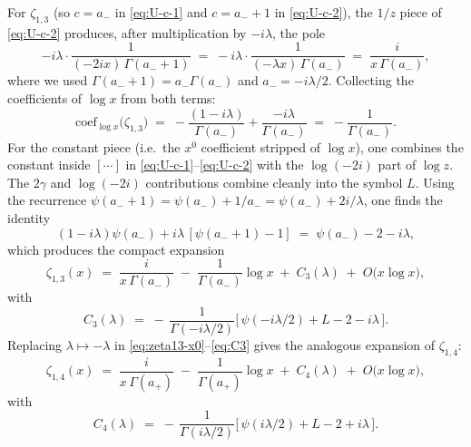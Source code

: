 \documentclass[
 aip,
 jmp,
 amsmath,amssymb,
 reprint,
 nofootinbib,
]{revtex4-2}
\begin{document}
For $\zeta_{1,3}$ (so $c=a_-$ in \eqref{eq:U-c-1} and $c=a_-+1$ in \eqref{eq:U-c-2}), the $1/z$ piece of \eqref{eq:U-c-2} produces, after multiplication by $-i\lambda$, the pole
\begin{equation}
    -i\lambda\cdot\frac{1}{(-2ix)\,\Gamma(a_- + 1)} \;=\; -i\lambda\cdot\frac{1}{(-\lambda x)\,\Gamma(a_-)} \;=\; \frac{i}{x\,\Gamma(a_-)},
\end{equation}
where we used $\Gamma(a_- + 1)=a_-\Gamma(a_-)$ and $a_-=-i\lambda/2$. Collecting the coefficients of $\log x$ from both terms:
\begin{equation}
    \text{coef}_{\log x}\big(\zeta_{1,3}\big) \;=\; -\frac{(1-i\lambda)}{\Gamma(a_-)} + \frac{-i\lambda}{\Gamma(a_-)} \;=\; -\frac{1}{\Gamma(a_-)}.
\end{equation}
For the constant piece (i.e.\ the $x^{0}$ coefficient stripped of $\log x$), one combines the constant inside $[\cdots]$ in \eqref{eq:U-c-1}--\eqref{eq:U-c-2} with the $\log(-2i)$ part of $\log z$. The $2\gamma$ and $\log(-2i)$ contributions combine cleanly into the symbol $L$. Using the recurrence $\psi(a_-+1)=\psi(a_-)+1/a_- = \psi(a_-) + 2i/\lambda$, one finds the identity
\begin{equation}
    (1-i\lambda)\psi(a_-) + i\lambda\,[\psi(a_-+1) - 1] \;=\; \psi(a_-) - 2 - i\lambda,
\end{equation}
which produces the compact expansion
\begin{equation}\label{eq:zeta13-x0}
    \zeta_{1,3}(x) \;=\; \frac{i}{x\,\Gamma(a_-)} \;-\; \frac{1}{\Gamma(a_-)}\log x \;+\; C_{3}(\lambda) \;+\; O\!\big(x\log x\big),
\end{equation}
with
\begin{equation}\label{eq:C3}
    \boxed{\;C_{3}(\lambda) \;=\; -\,\frac{1}{\Gamma(-i\lambda/2)}\Big[\,\psi(-i\lambda/2) + L - 2 - i\lambda\,\Big].\;}
\end{equation}
Replacing $\lambda\mapsto-\lambda$ in \eqref{eq:zeta13-x0}--\eqref{eq:C3} gives the analogous expansion of $\zeta_{1,4}$:
\begin{equation}\label{eq:zeta14-x0}
    \zeta_{1,4}(x) \;=\; \frac{i}{x\,\Gamma(a_+)} \;-\; \frac{1}{\Gamma(a_+)}\log x \;+\; C_{4}(\lambda) \;+\; O\!\big(x\log x\big),
\end{equation}
with
\begin{equation}\label{eq:C4}
    C_{4}(\lambda) \;=\; -\,\frac{1}{\Gamma(i\lambda/2)}\Big[\,\psi(i\lambda/2) + L - 2 + i\lambda\,\Big].
\end{equation}
\end{document}
